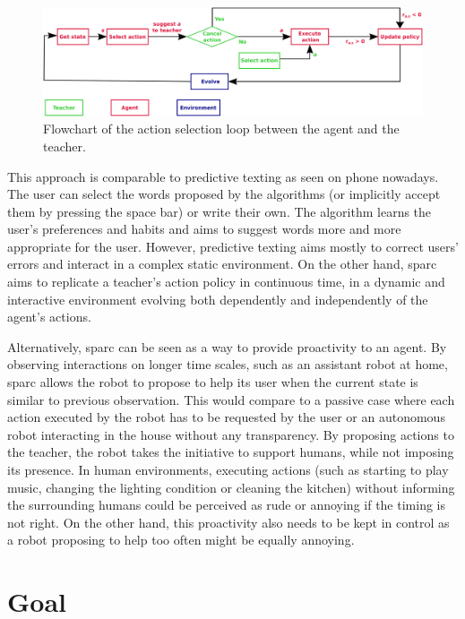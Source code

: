 \begin{figure}[ht]
	\includegraphics[width=1\linewidth]{flowchart.pdf}
	\centering
	\caption{Flowchart of the action selection loop between the agent and the teacher.}
	\label{fig:sparc_flowchart}
\end{figure}

This approach is comparable to predictive texting as seen on phone nowadays. The user can select the words proposed by the algorithms (or implicitly accept them by pressing the space bar) or write their own. The algorithm learns the user's preferences and habits and aims to suggest words more and more appropriate for the user. However, predictive texting aims mostly to correct users' errors and interact in a complex static environment. On the other hand, \gls{sparc} aims to replicate a teacher's action policy in continuous time, in a dynamic and interactive environment evolving both dependently and independently of the agent's actions.

Alternatively, \gls{sparc} can be seen as a way to provide proactivity to an agent. By observing interactions on longer time scales, such as an assistant robot at home, \gls{sparc} allows the robot to propose to help its user when the current state is similar to previous observation. This would compare to a passive case where each action executed by the robot has to be requested by the user or an autonomous robot interacting in the house without any transparency. By proposing actions to the teacher, the robot takes the initiative to support humans, while not imposing its presence. In human environments, executing actions (such as starting to play music, changing the lighting condition or cleaning the kitchen) without informing the surrounding humans could be perceived as rude or annoying if the timing is not right. On the other hand, this proactivity also needs to be kept in control as a robot proposing to help too often might be equally annoying.

\section{Goal}

